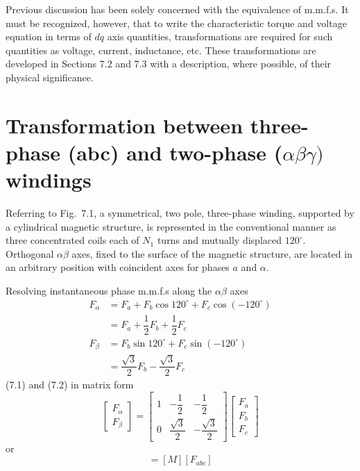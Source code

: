 \documentclass[a4paper,numbers=noenddot,12pt]{scrbook}
\begin{document}
    Previous discussion has been solely concerned with the equivalence of m.m.f.s. It must be recognized, however, that to write the characteristic torque and voltage equation in terms of $dq$ axis quantities, transformations are required for such quantities as voltage, current, inductance, etc. These transformations are developed in Sections 7.2 and 7.3 with a description, where possible, of their physical significance.

    \section{Transformation between three-phase {\mdseries(abc)} and two-phase \textrm{($\alpha \beta \gamma)$} windings}

    Referring to Fig.\ 7.1, a symmetrical, two pole, three-phase winding, supported by a cylindrical magnetic structure, is represented in the conventional manner as three concentrated coils each of $N_1$ turns and mutually displaced $120^{\circ}$. Orthogonal $\alpha \beta$ axes, fixed to the surface of the magnetic structure, are located in an arbitrary position with coincident axes for phases $a$ and $\alpha$.

    Resolving instantaneous phase m.m.f.s along the $\alpha \beta$ axes 
    \begin{align}
        F_{\alpha} & = F_a + F_b \cos 120^{\circ} + F_c \cos (-120^{\circ}) \nonumber \\
        & = F_a + \dfrac{1}{2} F_b + \dfrac{1}{2} F_c \\
        F_{\beta} & = F_b \sin 120^{\circ} + F_c \sin (-120^{\circ}) \nonumber \\
        & = \dfrac{\sqrt{3}}{2} F_b - \dfrac{\sqrt{3}}{2} F_c
        \label{eq:Eq7.2}
    \end{align}
    (7.1) and (7.2) in matrix form 
    \begin{equation}
        \begin{bmatrix}
            F_{\alpha} \\ F_{\beta} 
        \end{bmatrix}
        =
        \begin{bmatrix}
            1 & - \dfrac{1}{2} & -\dfrac{1}{2} \\[2ex]
            0 & \dfrac{\sqrt{3}}{2} & - \dfrac{\sqrt{3}}{2}
        \end{bmatrix}
        \begin{bmatrix}
            F_a \\ F_b \\ F_c 
        \end{bmatrix}
        \label{eq:Eq7.3}
    \end{equation}
    or
    \begin{equation}
        [F_{\alpha \beta}] = [M][F_{abc}]
        \label{eq:Eq7.4}
    \end{equation}
\end{document}
